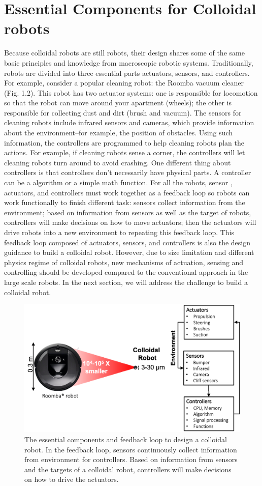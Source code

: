 \section{Essential Components for Colloidal robots}
Because colloidal robots are still robots, their design shares some of the same basic principles and knowledge from  macroscopic robotic systems.  Traditionally, robots are divided into three essential parts actuators, sensors, and controllers. For example, consider a popular cleaning robot: the Roomba vacuum cleaner (Fig. 1.2).  This robot has two actuator systems: one is responsible for locomotion so that the robot can move around your apartment (wheels); the other is responsible for collecting dust and dirt (brush and vacuum).
The sensors for cleaning robots include infrared  sensors and cameras, which provide information about the environment--for example, the position of obstacles. Using such information, the controllers are programmed  to help cleaning robots plan  the actions. For example, if cleaning robots sense a corner, the controllers will let cleaning robots turn around to avoid crashing. One different thing about controllers is that controllers don't necessarily have physical parts. A controller can be a algorithm or a simple math function.  For all the robots, sensor , actuators, and controllers must work together as a feedback loop so robots can work functionally to finish different task: sensors collect information from the environment; based on information from sensors as well as the target of robots,  controllers will make decisions  on how to move actuators; then the actuators will drive robots into a new environment to repeating this feedback loop. This feedback loop composed of actuators, sensors,  and controllers is also the design guidance to build a colloidal robot. However, due to size limitation and different physics regime of colloidal robots, new mechanisms of actuation, sensing and controlling should be developed compared to the conventional approach in the large scale robots.  In the next section, we will address the challenge to build a colloidal robot. 

\begin{figure}
\centering
\includegraphics[width=12cm]{figures/1_2.png}
\caption{The essential components and feedback loop to design a colloidal robot. In the feedback loop, sensors continuously collect information from environment for controllers. Based on  information from sensors and the targets of a colloidal robot, controllers will make decisions on how to drive the actuators.}
\label{fig:1.2}
\end{figure}

